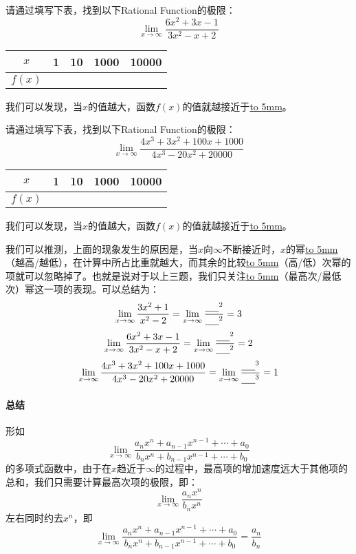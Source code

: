 \documentclass[UTF8]{ctexart}
\begin{document}
请通过填写下表，找到以下Rational Function的极限：
\[ {\lim_{x \to \infty} \frac{6x^2+3x -1}{3x^2 - x +2}}\]
\begin{center}
\begin{tabular}{c|c|c|c|c}
\hline
$x$  & 1 & 10 & 1000 & 10000 \\
\hline
$f(x)$ &   &  &  & \\
\hline
\end{tabular}
\end{center}
 我们可以发现，当$x$的值越大，函数$f(x)$的值就越接近于\underline{\hbox to 5mm{}}。

请通过填写下表，找到以下Rational Function的极限：
\[ {\lim_{x \to \infty} \frac{4x^3+3x^2+100x+1000}{4x^3 - 20x^2 +20000}}\]
\begin{center}
\begin{tabular}{c|c|c|c|c}
\hline
$x$  & 1 & 10 & 1000 & 10000 \\
\hline
$f(x)$ &   &  &  & \\
\hline
\end{tabular}
\end{center}
 我们可以发现，当$x$的值越大，函数$f(x)$的值就越接近于\underline{\hbox to 5mm{}}。

我们可以推测，上面的现象发生的原因是，当$x$向$\infty$不断接近时，$x$的幂\underline{\hbox to 5mm{}}（越高/越低），在计算中所占比重就越大，而其余的比较\underline{\hbox to 5mm{}}（高/低）次幂的项就可以忽略掉了。也就是说对于以上三题，我们只关注\underline{\hbox to 5mm{}}（最高次/最低次）幂这一项的表现。可以总结为：
\[ {\lim_{x \to \infty} \frac{3x^2+1}{x^2 - 2}} = {\lim_{x \to \infty} \frac{\underline{\hbox to 5mm{}}^2}{\underline{\hbox to 5mm{}}^2}} = 3\]
\[ {\lim_{x \to \infty} \frac{6x^2+3x -1}{3x^2 - x +2}} = {\lim_{x \to \infty} \frac{\underline{\hbox to 5mm{}}^2}{\underline{\hbox to 5mm{}}^2}} = 2\]
\[ {\lim_{x \to \infty} \frac{4x^3+3x^2+100x+1000}{4x^3 - 20x^2 +20000}} = {\lim_{x \to \infty} \frac{\underline{\hbox to 5mm{}}^3}{\underline{\hbox to 5mm{}}^3}} = 1\]

\paragraph{总结}
形如
\[{\lim_{x \to \infty} \frac{a_nx^n + a_{n-1}x^{n-1} +\cdots + a_0}{b_nx^n + b_{n-1}x^{n-1} +\cdots + b_0}}\]
的多项式函数中，由于在$x$趋近于$\infty$的过程中，最高项的增加速度远大于其他项的总和，我们只需要计算最高次项的极限，即：
\[{\lim_{x \to \infty} \frac{a_nx^n}{b_nx^n}}\]
左右同时约去$x^n$，即
\[{\lim_{x \to \infty} \frac{a_nx^n + a_{n-1}x^{n-1} +\cdots + a_0}{b_nx^n + b_{n-1}x^{n-1} +\cdots + b_0}} = \frac{a_n}{b_n}\]
\end{document}
